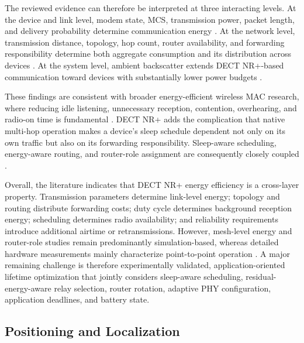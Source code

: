 The reviewed evidence can therefore be interpreted at three interacting levels. At the device and link level, modem state, MCS, transmission power, packet length, and delivery probability determine communication energy \cite{bandaraExperimentalValidationAnalysis2025, grafWhatExpectWhen2026, grafParetoOptimalityApproach2026a}. At the network level, transmission distance, topology, hop count, router availability, and forwarding responsibility determine both aggregate consumption and its distribution across devices \cite{kovalchukovDECT2020NewRadio2022, nihtilaEnergyConsumptionDECT20202022, nihtilaEnergySavingRouter2022}. At the system level, ambient backscatter extends DECT NR+-based communication toward devices with substantially lower power budgets \cite{liaoDataAssistedBackscatter2025}.

These findings are consistent with broader energy-efficient wireless MAC research, where reducing idle listening, unnecessary reception, contention, overhearing, and radio-on time is fundamental \cite{tsaoSurveyEnergyEfficient2011}. DECT NR+ adds the complication that native multi-hop operation makes a device's sleep schedule dependent not only on its own traffic but also on its forwarding responsibility. Sleep-aware scheduling, energy-aware routing, and router-role assignment are consequently closely coupled \cite{nihtilaEnergyConsumptionDECT20202022, nihtilaEnergySavingRouter2022}.

Overall, the literature indicates that DECT NR+ energy efficiency is a cross-layer property. Transmission parameters determine link-level energy; topology and routing distribute forwarding costs; duty cycle determines background reception energy; scheduling determines radio availability; and reliability requirements introduce additional airtime or retransmissions. However, mesh-level energy and router-role studies remain predominantly simulation-based, whereas detailed hardware measurements mainly characterize point-to-point operation \cite{nihtilaEnergyConsumptionDECT20202022, nihtilaEnergySavingRouter2022, bandaraExperimentalValidationAnalysis2025, grafWhatExpectWhen2026, grafParetoOptimalityApproach2026a}. A major remaining challenge is therefore experimentally validated, application-oriented lifetime optimization that jointly considers sleep-aware scheduling, residual-energy-aware relay selection, router rotation, adaptive PHY configuration, application deadlines, and battery state.


\subsection{Positioning and Localization}
\label{subsec:positioning}

